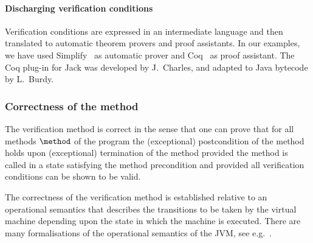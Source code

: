 

\paragraph{Discharging verification conditions}
Verification conditions are expressed in an intermediate language and
then translated to automatic theorem provers and proof assistants.  In
our examples, we have used Simplify~\cite{simplify} as automatic
prover and Coq~\cite{coq} as proof assistant. The Coq plug-in for Jack
was developed by J.~Charles, and adapted to Java bytecode by L.~Burdy.


\subsubsection{Correctness of the method}\label{subsec:sound}
The verification method is correct in the sense that one can prove
that for all methods $\method$ of the program the (exceptional)
postcondition of the method holds upon (exceptional) termination of
the method provided the method is called in a state satisfying the
method precondition and provided all verification conditions can be
shown to be valid.


The correctness of the verification method is established relative to
an operational semantics that describes the transitions to be taken by
the virtual machine depending upon the state in which the machine is
executed. There are many formalisations of the operational semantics
of the JVM, see
e.g.~\cite{FM03:jar,KN02:tcs,siv04:jlap,BSS:jbook}. 


